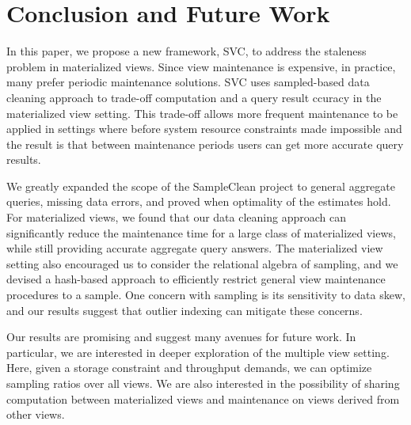 \vspace{-1em}
\section{Conclusion and Future Work}\label{conclusion}
\vspace{-.3em}
In this paper, we propose a new framework, SVC, to address the staleness problem in materialized views.
Since view maintenance is expensive, in practice, many prefer periodic maintenance solutions.
SVC uses sampled-based data cleaning approach to trade-off computation and a query result ccuracy in the materialized view setting.
This trade-off allows more frequent maintenance to be applied in settings where before system resource constraints made impossible and the result is that between maintenance periods users can get more accurate query results.

We greatly expanded the scope of the SampleClean project \cite{wang1999sample} to general aggregate queries, missing data errors, and proved when optimality of the estimates hold.
For materialized views, we found that our data cleaning approach can significantly reduce the maintenance time for a large class of materialized views, while still providing accurate aggregate query answers.
The materialized view setting also encouraged us to consider the relational algebra of sampling, and we devised a hash-based approach to efficiently restrict general view maintenance procedures to a sample.
One concern with sampling is its sensitivity to data skew, and our results suggest that outlier indexing can mitigate these concerns.

\iffalse
We evaluated our approach on real and synthetic datasets.
We use the TPCD benchmark to illustrate three common use cases of materialized views: joins, data-cube aggregates, and nested queries.
We also evaluated our approach on an industrial dataset from Conviva, where we demonstrated similar performance and accuracy.
We simulated a real deployment where we integrate SVC with periodic maintenance, and showed that SVC can exploit idle times in the system to give more accurate query results.
\fi

Our results are promising and suggest many avenues for future work.
In particular, we are interested in deeper exploration of the multiple view setting.
Here, given a storage constraint and throughput demands, we can optimize sampling ratios over all views.
We are also interested in the possibility of sharing computation between materialized views and maintenance on views derived from other views.




